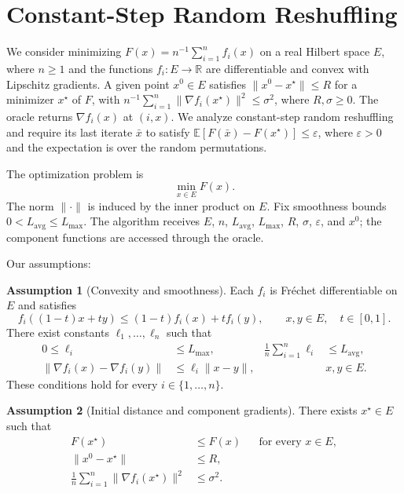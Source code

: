 \documentclass[10pt]{article}
\theoremstyle{definition}
\newtheorem{assumption}{Assumption}
\begin{document}
\section*{Constant-Step Random Reshuffling}
We consider minimizing $F(x)=n^{-1}\sum_{i=1}^n f_i(x)$ on a real Hilbert space $E$, where $n\geq1$ and the functions $f_i:E\to\mathbb{R}$ are differentiable and convex with Lipschitz gradients. A given point $x^0\in E$ satisfies $\|x^0-x^\star\|\leq R$ for a minimizer $x^\star$ of $F$, with $n^{-1}\sum_{i=1}^n\|\nabla f_i(x^\star)\|^2\leq\sigma^2$, where $R,\sigma\geq0$. The oracle returns $\nabla f_i(x)$ at $(i,x)$. We analyze constant-step random reshuffling and require its last iterate $\bar{x}$ to satisfy $\mathbb{E}[F(\bar{x})-F(x^\star)]\leq\varepsilon$, where $\varepsilon>0$ and the expectation is over the random permutations.

The optimization problem is
\[
\min_{x\in E} F(x).
\]
The norm $\|\cdot\|$ is induced by the inner product on $E$. Fix smoothness bounds $0<L_{\mathrm{avg}}\leq L_{\max}$. The algorithm receives $E$, $n$, $L_{\mathrm{avg}}$, $L_{\max}$, $R$, $\sigma$, $\varepsilon$, and $x^0$; the component functions are accessed through the oracle.

Our assumptions:
\begin{assumption}[Convexity and smoothness]
Each $f_i$ is Fr\'echet differentiable on $E$ and satisfies
\[
f_i((1-t)x+ty)\leq(1-t)f_i(x)+t f_i(y),
\qquad x,y\in E,\quad t\in[0,1].
\]
There exist constants $\ell_1,\ldots,\ell_n$ such that
\[
\begin{aligned}
0\leq\ell_i&\leq L_{\max},
&\frac1n\sum_{i=1}^n\ell_i&\leq L_{\mathrm{avg}},\\
\|\nabla f_i(x)-\nabla f_i(y)\|&\leq\ell_i\|x-y\|,
&&x,y\in E.
\end{aligned}
\]
These conditions hold for every $i\in\{1,\ldots,n\}$.
\end{assumption}

\begin{assumption}[Initial distance and component gradients]
There exists $x^\star\in E$ such that
\[
\begin{aligned}
F(x^\star)&\leq F(x) &&\text{for every }x\in E,\\
\|x^0-x^\star\|&\leq R,\\
\frac1n\sum_{i=1}^n\|\nabla f_i(x^\star)\|^2&\leq\sigma^2.
\end{aligned}
\]
\end{assumption}
\end{document}
